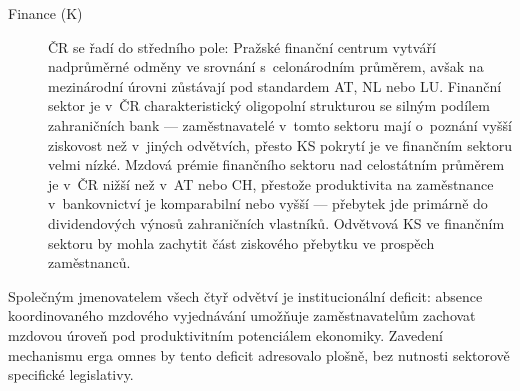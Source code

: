\begin{description}
  \item[Finance (K)]
    ČR se řadí do středního pole: Pražské finanční centrum vytváří nadprůměrné odměny ve srovnání s~celonárodním průměrem, avšak na mezinárodní úrovni zůstávají pod standardem AT, NL nebo LU.
    Finanční sektor je v~ČR charakteristický oligopolní strukturou se silným podílem zahraničních bank --- zaměstnavatelé v~tomto sektoru mají o~poznání vyšší ziskovost než v~jiných odvětvích, přesto \ac{KS} pokrytí je ve finančním sektoru velmi nízké.
    Mzdová prémie finančního sektoru nad celostátním průměrem je v~ČR nižší než v~AT nebo CH, přestože produktivita na zaměstnance v~bankovnictví je komparabilní nebo vyšší --- přebytek jde primárně do dividendových výnosů zahraničních vlastníků.
    Odvětvová \ac{KS} ve finančním sektoru by mohla zachytit část ziskového přebytku ve prospěch zaměstnanců.
\end{description}

Společným jmenovatelem všech čtyř odvětví je institucionální deficit: absence koordinovaného mzdového vyjednávání umožňuje zaměstnavatelům zachovat mzdovou úroveň pod produktivitním potenciálem ekonomiky.
Zavedení mechanismu erga omnes by tento deficit adresovalo plošně, bez nutnosti sektorově specifické legislativy.


